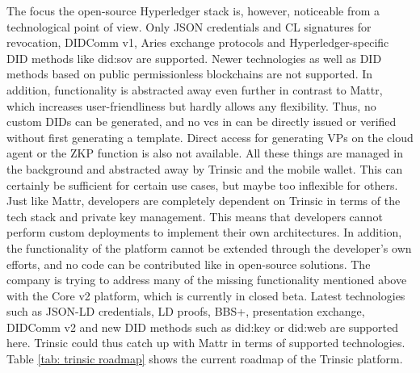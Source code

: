             The focus the open-source Hyperledger stack is, however, noticeable from a technological point of view. Only JSON credentials and CL signatures for revocation, DIDComm v1, Aries exchange protocols and Hyperledger-specific \ac{DID} methods like did:sov are supported. Newer technologies as well as \ac{DID} methods based on public permissionless blockchains are not supported. In addition, functionality is abstracted away even further in contrast to Mattr, which increases user-friendliness but hardly allows any flexibility. Thus, no custom \acp{DID} can be generated, and no \acp{vc} in can be directly issued or verified without first generating a template. Direct access for generating \acp{VP} on the cloud agent or the \ac{ZKP} function is also not available. All these things are managed in the background and abstracted away by Trinsic and the mobile wallet. This can certainly be sufficient for certain use cases, but maybe too inflexible for others. Just like Mattr, developers are completely dependent on Trinsic in terms of the tech stack and private key management. This means that developers cannot perform custom deployments to implement their own architectures. In addition, the functionality of the platform cannot be extended through the developer's own efforts, and no code can be contributed like in open-source solutions. The company is trying to address many of the missing functionality mentioned above with the Core v2 platform, which is currently in closed beta. Latest technologies such as JSON-LD credentials, LD proofs, BBS+, presentation exchange, DIDComm v2 and new \ac{DID} methods such as did:key or did:web are supported here. Trinsic could thus catch up with Mattr in terms of supported technologies. Table \ref{tab: trinsic roadmap} shows the current roadmap of the Trinsic platform. 
            \newline
    
